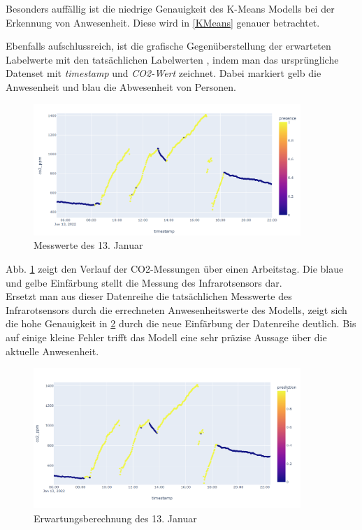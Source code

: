 Besonders auffällig ist die niedrige Genauigkeit des K-Means Modells bei der Erkennung von Anwesenheit. Diese 
wird in \ref{KMeans} genauer betrachtet.
\newpage

Ebenfalls aufschlussreich, ist die grafische Gegenüberstellung der erwarteten Labelwerte mit den tatsächlichen Labelwerten
, indem man das ursprüngliche Datenset mit \textit{timestamp} und \textit{CO2-Wert} zeichnet. Dabei markiert gelb 
die Anwesenheit und blau die Abwesenheit von Personen.

\begin{figure}[h]
    \centering
    \includegraphics[width=0.9\textwidth]{pic/nov23_actual.png}
    \caption{Messwerte des 13. Januar}
    \label{fig:nov23}
\end{figure}

Abb. \ref{fig:nov23} zeigt den Verlauf der CO2-Messungen über einen Arbeitstag. Die blaue und gelbe Einfärbung stellt
die Messung des Infrarotsensors dar.\\ 
Ersetzt man aus dieser Datenreihe die tatsächlichen Messwerte des Infrarotsensors durch die errechneten 
Anwesenheitswerte des Modells, zeigt sich die hohe Genauigkeit in \ref{fig:nov23_pred} durch die neue Einfärbung 
der Datenreihe deutlich. 
Bis auf einige kleine Fehler trifft das Modell eine sehr präzise Aussage über die aktuelle Anwesenheit.

\begin{figure}[h]
    \centering
    \includegraphics[width=0.9\textwidth]{pic/nov23_predicted.png}
    \caption{Erwartungsberechnung des 13. Januar}
    \label{fig:nov23_pred}
\end{figure}

